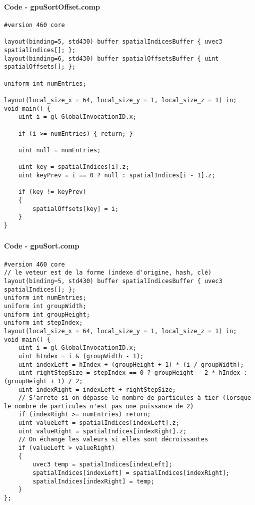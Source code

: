 \begin{frame}[fragile]
    \frametitle{\anxpti}
    \framesubtitle{Code - gpuSortOffset.comp}

    \begin{verbatim}
#version 460 core

layout(binding=5, std430) buffer spatialIndicesBuffer { uvec3 spatialIndices[]; };
layout(binding=6, std430) buffer spatialOffsetsBuffer { uint spatialOffsets[]; };

uniform int numEntries;

layout(local_size_x = 64, local_size_y = 1, local_size_z = 1) in;
void main() {
    uint i = gl_GlobalInvocationID.x;
    
    if (i >= numEntries) { return; }

    uint null = numEntries;

    uint key = spatialIndices[i].z;
    uint keyPrev = i == 0 ? null : spatialIndices[i - 1].z;

    if (key != keyPrev)
    {
        spatialOffsets[key] = i;
    }
}
    \end{verbatim}
\end{frame}


\begin{frame}[fragile]
    \frametitle{\anxpti}
    \framesubtitle{Code - gpuSort.comp}

    \begin{verbatim}
#version 460 core
// le veteur est de la forme (indexe d'origine, hash, clé)
layout(binding=5, std430) buffer spatialIndicesBuffer { uvec3 spatialIndices[]; };
uniform int numEntries;
uniform int groupWidth;
uniform int groupHeight;
uniform int stepIndex;
layout(local_size_x = 64, local_size_y = 1, local_size_z = 1) in;
void main() {
    uint i = gl_GlobalInvocationID.x;
    uint hIndex = i & (groupWidth - 1);
    uint indexLeft = hIndex + (groupHeight + 1) * (i / groupWidth);
    uint rightStepSize = stepIndex == 0 ? groupHeight - 2 * hIndex : (groupHeight + 1) / 2;
    uint indexRight = indexLeft + rightStepSize;
    // S'arrete si on dépasse le nombre de particules à tier (lorsque le nombre de particules n'est pas une puissance de 2)
    if (indexRight >= numEntries) return;
    uint valueLeft = spatialIndices[indexLeft].z;
    uint valueRight = spatialIndices[indexRight].z;
    // On échange les valeurs si elles sont décroissantes
    if (valueLeft > valueRight)
    {
        uvec3 temp = spatialIndices[indexLeft];
        spatialIndices[indexLeft] = spatialIndices[indexRight];
        spatialIndices[indexRight] = temp;
    }
};
    \end{verbatim}
\end{frame}


